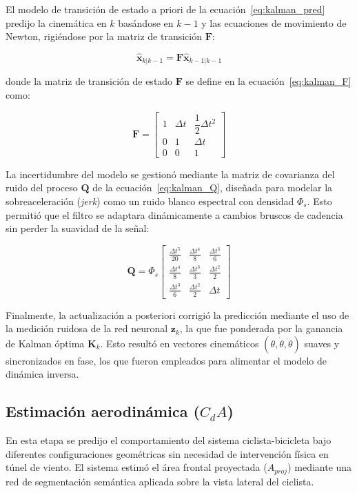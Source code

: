 El modelo de transición de estado a priori de la ecuación~\ref{eq:kalman_pred} predijo la cinemática en $k$
basándose en $k-1$ y las ecuaciones de movimiento de Newton, rigiéndose por la
matriz de transición $\mathbf{F}$:

\begin{equation}
  \label{eq:kalman_pred}
  \hat{\mathbf{x}}_{k|k-1} = \mathbf{F} \hat{\mathbf{x}}_{k-1|k-1}
\end{equation}

donde la matriz de transición de estado $\mathbf{F}$ se define en la ecuación~\ref{eq:kalman_F} como:

\begin{equation}
  \label{eq:kalman_F}
  \mathbf{F} =
  \begin{bmatrix}
    1 & \Delta t & \dfrac{1}{2}\Delta t^2 \\
    0 & 1        & \Delta t               \\
    0 & 0        & 1
  \end{bmatrix}
\end{equation}

La incertidumbre del modelo se gestionó mediante la matriz de covarianza del
ruido del proceso $\mathbf{Q}$ de la ecuación~\ref{eq:kalman_Q}, diseñada para modelar la
sobreaceleración (\textit{jerk}) como un ruido blanco espectral con densidad
$\Phi_s$. Esto permitió que el filtro se adaptara dinámicamente a cambios
bruscos de cadencia sin perder la suavidad de la señal:

\begin{equation}
  \label{eq:kalman_Q}
  \mathbf{Q} = \Phi_s \begin{bmatrix} \frac{\Delta t^5}{20} & \frac{\Delta t^4}{8} & \frac{\Delta t^3}{6} \\ \frac{\Delta t^4}{8} & \frac{\Delta t^3}{3} & \frac{\Delta t^2}{2} \\ \frac{\Delta t^3}{6} & \frac{\Delta t^2}{2} & \Delta t \end{bmatrix}
\end{equation}

Finalmente, la actualización a posteriori corrigió la predicción mediante el
uso de la medición ruidosa de la red neuronal $\mathbf{z}_k$, la que fue
ponderada por la ganancia de Kalman óptima $\mathbf{K}_k$. Esto resultó en
vectores cinemáticos $(\theta, \dot{\theta}, \ddot{\theta})$ suaves y
sincronizados en fase, los que fueron empleados para alimentar el modelo de
dinámica inversa.

\subsection{Estimación aerodinámica ($C_d A$)}
\label{subsec:estimacion_aerodinamica}
En esta etapa se predijo el comportamiento del sistema ciclista-bicicleta bajo
diferentes configuraciones geométricas sin necesidad de intervención física en
túnel de viento. El sistema estimó el área frontal proyectada ($A_{proj}$)
mediante una red de segmentación semántica aplicada sobre la vista lateral del
ciclista.

